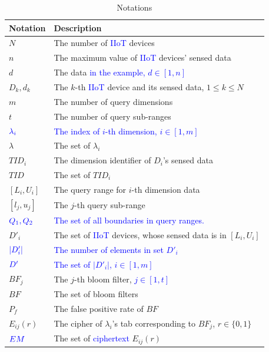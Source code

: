 \documentclass[IEEE JOURNAL OF BIOMEDICAL AND HEALTH INFORMATICS]{IEEEtran}
\begin{document}
{\begin{table}[h]
	\centering\caption{Notations}
	\label{Notations}
	\begin{tabular}{ll} %
		\hline
		Notation           & Description\\
		\hline
		$N$                & The number of \textcolor{blue}{IIoT} devices\\
		$n$                & The maximum value of \textcolor{blue}{IIoT} devices' sensed data \\
		$d$                & The data \textcolor{blue}{in the example, $d\in [1, n]$}\\
		$D_k, d_k$         & The $k$-th \textcolor{blue}{IIoT} device and its sensed data, $1 \le k \le N$ \\
		$m$                & The number of query dimensions  \\
		$t$                & The number of query sub-ranges  \\
		$\textcolor{blue}{\lambda_i}$   & \textcolor{blue}{The index of $i$-th dimension, $i\in[1, m]$}\\
		$\lambda$          & The set of $\lambda_i$\\
		$TID_i$            & The dimension identifier of $D_i$'s sensed data\\
		$TID$              & The set of $TID_i$\\
		$[L_i, U_i]$       & The query range for $i$-th dimension data\\
		$[l_j, u_j]$       & The $j$-th query sub-range \\
		$\textcolor{blue}{Q_1, Q_2}$ & \textcolor{blue}{The set of all boundaries in query ranges.} \\
		$D'_i$             & The set of \textcolor{blue}{IIoT} devices, whose sensed data is in $[L_i, U_i]$\\
		$\textcolor{blue}{|D'_i|}$ & \textcolor{blue}{The number of elements in set $D'_i$}\\
		$\textcolor{blue}{D'}$  & \textcolor{blue}{The set of $|D'_i|$, $i\in[1, m]$}\\
		$BF_j$  		   & The $j$-th bloom filter, \textcolor{blue}{$j\in [1, t]$} \\
		$BF$               & The set of bloom filters\\
		$P_f$              & The false positive rate of $BF$\\
		$E_{ij}(r)$        & The cipher of $\lambda_i$'s tab corresponding to $BF_j$, $r\in\{0, 1\}$\\
		$\textcolor{blue}{EM}$             & The set of \textcolor{blue}{ciphertext} $E_{ij}(r)$\\

\end{tabular}
\end{table}}
\end{document}
